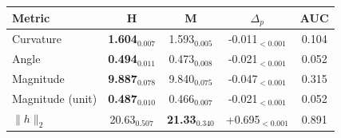 \begin{tabular}{lcccc}
\toprule
\textbf{Metric} & \textbf{H} & \textbf{M} & \textbf{$\Delta_p$} & \textbf{AUC} \\
\midrule
Curvature & \textbf{1.604}$_{0.007}$ & 1.593$_{0.005}$ & -0.011$_{<0.001}$ & 0.104 \\
Angle & \textbf{0.494}$_{0.011}$ & 0.473$_{0.008}$ & -0.021$_{<0.001}$ & 0.052 \\
Magnitude & \textbf{9.887}$_{0.078}$ & 9.840$_{0.075}$ & -0.047$_{<0.001}$ & 0.315 \\
Magnitude (unit) & \textbf{0.487}$_{0.010}$ & 0.466$_{0.007}$ & -0.021$_{<0.001}$ & 0.052 \\
$\|h\|_2$ & 20.63$_{0.507}$ & \textbf{21.33}$_{0.340}$ & +0.695$_{<0.001}$ & 0.891 \\
\bottomrule
\end{tabular}
